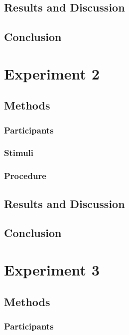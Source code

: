 \documentclass[man]{apa2}
\begin{document}
\subsection{Results and Discussion}

\subsection{Conclusion}

\section{Experiment 2}

\subsection{Methods}

\subsubsection{Participants} 
\subsubsection{Stimuli}



\subsubsection{Procedure}

\subsection{Results and Discussion}

\subsection{Conclusion}



\section{Experiment 3}

\subsection{Methods}

\subsubsection{Participants} 
\end{document}
